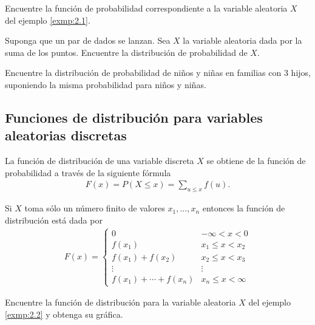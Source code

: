 \begin{ejemplo}
	\label{exmp:2.2}
	Encuentre la función de probabilidad correspondiente a la variable aleatoria $X$ del ejemplo \ref{exmp:2.1}.
\end{ejemplo}



\begin{ejemplo}
	\label{sol:2.1}
	Suponga que un par de dados se lanzan. Sea $X$ la variable aleatoria dada por la suma de los puntos. Encuentre la distribución de probabilidad de $X.$
\end{ejemplo}



\begin{ejemplo}
	\label{sol:2.2}
	Encuentre la distribución de probabilidad de niños y niñas en familias con 3 hijos, suponiendo la misma probabilidad para niños y niñas.
\end{ejemplo}



\subsection{Funciones de distribución para variables aleatorias discretas}


La función de distribución de una variable discreta $X$ se obtiene de la función de probabilidad a través de la siguiente fórmula
\begin{align}
	\label{2.4}
	F(x) = P(X\leq x) = \sum_{u \leq x} f(u).
\end{align}



Si $X$ toma sólo un número finito de valores $x_{1},...,x_{n}$ entonces la función de distribución está dada por
\begin{align}
	\label{2.5}
	F(x)=
	\begin{cases}
		0 & -\infty < x < 0 \\
		f(x_{1}) & x_{1} \leq x < x_{2} \\
		f(x_{1})+f(x_{2}) & x_{2} \leq x < x_{3} \\
		\vdots & \vdots \\
		f(x_{1})+\cdots+f(x_{n}) & x_{n} \leq x < \infty
	\end{cases}
\end{align}



\begin{ejemplo}
	\label{exmp:2.3}
	Encuentre la función de distribución para la variable aleatoria $X$ del ejemplo \ref{exmp:2.2} y obtenga su gráfica.
\end{ejemplo}



